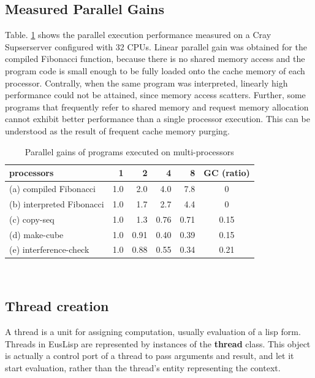 \subsection{Measured Parallel Gains}

Table. \ref{paragain} shows the parallel execution performance
measured on a Cray Supserserver configured with 32 CPUs.
Linear parallel gain was obtained for the compiled Fibonacci function,
because there is no shared memory access and  the program code
is small enough to be fully loaded onto the cache memory of
each processor.
Contrally, when the same program was interpreted, linearly
high performance could not be attained, since memory access
scatters. Further, some programs that frequently refer to 
shared memory and request memory allocation cannot exhibit better
performance than a single processor execution.
This can be understood as the result of frequent  cache memory
purging.

\begin{table}
\begin{center}
\begin{tabular}{|l|r|r|r|r|c|}  \hline
processors & 1 & 2 & 4 & 8 & GC (ratio) \\ \hline
(a) compiled Fibonacci & 1.0 & 2.0 & 4.0 & 7.8 & 0 \\ \hline
(b) interpreted Fibonacci & 1.0 & 1.7 & 2.7 & 4.4 & 0 \\ \hline
(c) copy-seq & 1.0 & 1.3 & 0.76 & 0.71 & 0.15 \\ \hline
(d) make-cube & 1.0 & 0.91 & 0.40 & 0.39 &  0.15 \\ \hline
(e) interference-check & 1.0 & 0.88 & 0.55 & 0.34 & 0.21 \\ \hline
\end{tabular} \\
\caption{\label{paragain}Parallel gains of programs executed on multi-processors}
\end{center}
\end{table}

\subsection{Thread creation}
A thread is a unit for assigning computation, usually evaluation
of a lisp form.
Threads in EusLisp are represented by instances of
the {\bf thread} class.
This object is actually a control port of a thread 
to pass arguments and result, and let it start evaluation,
rather than the thread's entity representing the context.

